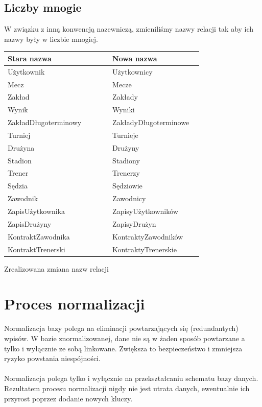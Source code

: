 \documentclass{mwrep}
\begin{document}
\subsection{Liczby mnogie}
W związku z inną konwencją nazewniczą, zmieniliśmy nazwy relacji tak aby ich nazwy były w liczbie mnogiej.

\begin{threeparttable}[H]
	\begin{tabular}{|p{0.5\linewidth}|p{0.43\linewidth}|}
	\hline
	Stara nazwa & Nowa nazwa \\ \hline
	Użytkownik & Użytkownicy \\ \hline
	Mecz & Mecze \\ \hline
	Zakład & Zakłady \\ \hline
	Wynik & Wyniki \\ \hline
	ZakładDługoterminowy & ZakładyDługoterminowe \\ \hline
	Turniej & Turnieje \\ \hline
	Drużyna & Drużyny \\ \hline
	Stadion & Stadiony \\ \hline
	Trener & Trenerzy \\ \hline
	Sędzia & Sędziowie \\ \hline
	Zawodnik & Zawodnicy \\ \hline
	ZapisUżytkownika & ZapisyUżytkowników \\ \hline
	ZapisDrużyny & ZapisyDrużyn \\ \hline
	KontraktZawodnika & KontraktyZawodników \\ \hline
	KontraktTrenerski & KontraktyTrenerskie \\ \hline
	\end{tabular}	
	\caption{Zrealizowana zmiana nazw relacji}
\end{threeparttable}
\vspace{0.5cm}


\section{Proces normalizacji}
Normalizacja bazy polega na eliminacji powtarzających się (redundantych) wpisów. W bazie 
znormalizowanej, dane nie są w żaden sposób powtarzane a tylko i wyłącznie ze sobą linkowane. 
Zwiększa to bezpieczeństwo i zmniejsza ryzyko powstania niespójności. \\
\\
\indent Normalizacja polega tylko i wyłącznie na przekształcaniu schematu bazy danych. Rezultatem
procesu normalizacji nigdy nie jest utrata danych, ewentualnie ich przyrost poprzez dodanie nowych
kluczy\cite{Kowalczyk1}.
\end{document}
